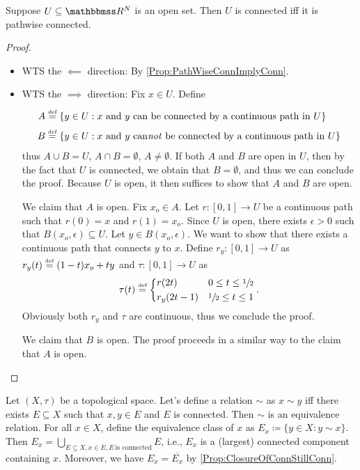 \documentclass[screen,single]{techreport}
\numberwithin{equation}{section}
\begin{document}
\begin{proposition}\label{Prop:OpenSetInEuclideanSpaceConn}
	Suppose $U \subseteq \bbR^N$ is an open set.
	Then $U$ is connected iff it is pathwise connected.
\end{proposition}
\begin{proof}\
	\begin{itemize}
	  \item WTS the $\impliedby$ direction: By \cref{Prop:PathWiseConnImplyConn}.
	  \item WTS the $\implies$ direction: Fix $x \in U$.
	  Define
	  \begin{align*}
	   A & \mathrel{\overset{\underset{\textnormal{def}}{}}{=}} \{ y \in U : \text{$x$ and $y$ can be connected by a continuous path in $U$} \} \\
	   B & \mathrel{\overset{\underset{\textnormal{def}}{}}{=}} \{ y \in U : \text{$x$ and $y$ can\emph{not} be connected by a continuous path in $U$} \}  
	  \end{align*}
      thus $A \cup B = U$, $A \cap B = \emptyset$, $A \neq \emptyset$.
      If both $A$ and $B$ are open in $U$, then by the fact that $U$ is connected, we obtain that $B = \emptyset$, and thus we can conclude the proof.
      Because $U$ is open, it then suffices to show that $A$ and $B$ are open.
      
      We claim that $A$ is open. Fix $x_o \in A$.
      Let $r : [0,1] \to U$ be a continuous path such that $r(0)=x$ and $r(1)=x_o$.
      Since $U$ is open, there exists $\epsilon>0$ such that $B(x_o,\epsilon) \subseteq U$.
      Let $y \in B(x_o,\epsilon)$. We want to show that there exists a continuous path that connects $y$ to $x$.
      Define $r_y : [0,1] \to U$ as $r_y(t) \mathrel{\overset{\underset{\textnormal{def}}{}}{=}} (1-t)x_o + ty$ and $\tau : [0,1] \to U$ as
      \[
      \tau(t) \mathrel{\overset{\underset{\textnormal{def}}{}}{=}} \begin{dcases}
   r(2t) & 0 \le t \le \sfrac{1}{2} \\
   r_y(2t-1) & \sfrac{1}{2} \le t \le 1
 \end{dcases}.
 \]
    Obviously both $r_y$ and $\tau$ are continuous, thus we conclude the proof.
    
    We claim that $B$ is open. The proof proceeds in a similar way to the claim that $A$ is open.
	\end{itemize}
\end{proof}

\begin{definition}\label{De:ConnEquivalenceRelation}
	Let $(X,\tau)$ be a topological space.
	Let's define a relation ${\sim}$ as $x \sim y$ iff there exists $E \subseteq X$ such that $x,y\in E$ and $E$ is connected.
	Then ${\sim}$ is an equivalence relation.
	For all $x \in X$, define the equivalence class of $x$ as $E_x \coloneqq \{ y \in X : y \sim x \}$.
	Then $E_x = \bigcup_{E \subseteq X, x \in E, E~\text{is connected}} E$, i.e., $E_x$ is a (largest) connected component containing $x$.
	Moreover, we have $E_x = \overline{E_x}$ by \cref{Prop:ClosureOfConnStillConn}.
\end{definition}
\end{document}
